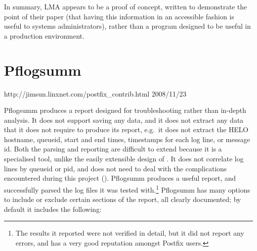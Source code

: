 In summary, \gls{LMA} appears to be a proof of concept, written to
demonstrate the point of their paper (that having this information in an
accessible fashion is useful to systems administrators), rather than a
program designed to be useful in a production environment.

%

\section{Pflogsumm}

{http://jimsun.linxnet.com/postfix_contrib.html}
{2008/11/23}

Pflogsumm produces a report designed for troubleshooting rather than
in-depth analysis.  It does not support saving any data, and it does not
extract any data that it does not require to produce its report, e.g.\ it
does not extract the HELO hostname, queueid, start and end times,
timestamps for each log line, or message id.  Both the parsing and
reporting are difficult to extend because it is a specialised tool, unlike
the easily extensible design of \parsername{}.  It does not correlate log
lines by queueid or \gls{pid}, and does not need to deal with the
complications encountered during this project ().
Pflogsumm produces a useful report, and successfully parsed the
\numberOFlogFILES{} log files it was tested with.\footnote{The results it
reported were not verified in detail, but it did not report any errors, and
has a very good reputation amongst Postfix users.}  Pflogsumm has many
options to include or exclude certain sections of the report, all clearly
documented; by default it includes the following:

